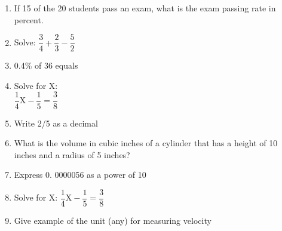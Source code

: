 \documentclass{article}
\begin{document}
\begin{enumerate}
\item If 15 of the 20 students pass an exam, what is the exam passing rate in percent.
\vspace{3cm}
\item Solve:  $\dfrac{3}{4}+\dfrac{2}{3}-\dfrac{5}{2}$
\vspace{3cm}
\item 0.4\% of 36 equals
\vspace{3cm}
\item Solve for X:\\
\vspace{0.2cm}
$\dfrac{1}{4}\mathrm{X}-\dfrac{1}{5}=\dfrac{3}{8}$
\vspace{3cm}
\item Write 2/5 as a decimal

\newpage

\item What is the volume in cubic inches of a cylinder that has a height of 10 inches
and a radius of 5 inches?

\vspace{3cm}


\item  Express 0. 0000056 as a power of 10
\vspace{3cm}
\item Solve for X: $\dfrac{1}{4}\mathrm{X}-\dfrac{1}{5}=\dfrac{3}{8}$

\vspace{3cm}

\item Give example of the unit (any) for measuring velocity 


\end{enumerate}
\end{document}
